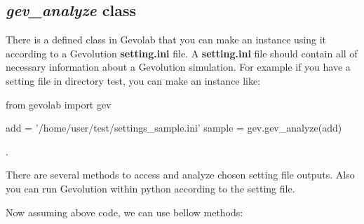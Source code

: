 \documentclass[a4paper, 12 pt]{article}
\begin{document}

\subsection{\textit{gev\_analyze} class}
There is a defined class in Gevolab that you can make an instance using it according to a Gevolution \textbf{setting.ini} file. A \textbf{setting.ini} file should contain all of necessary information about a Gevolution simulation. For example if you have a setting file in directory test, you can make an instance like:

\begin{python}[language=Python, caption=instance definition]
from gevolab import gev

add = '/home/user/test/settings_sample.ini'
sample = gev.gev_analyze(add)

\end{python}.

There are several methods to access and analyze chosen setting file outputs. Also you can run Gevolution within python according to the setting file.

Now assuming above code, we  can use bellow methods:
\end{document}

